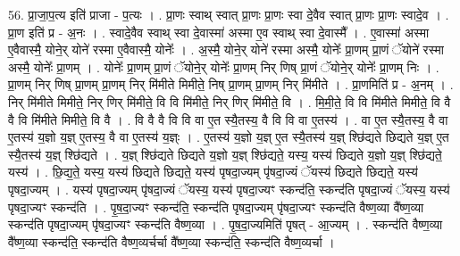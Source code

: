 \documentclass[17pt]{extarticle}
\begin{document}
56. प्रा॒जा॒प॒त्य इति॑ प्राजा - प॒त्यः । . प्रा॒णः स्वाथ् स्वात् प्रा॒णः प्रा॒णः स्वा दे॒वैव स्वात् प्रा॒णः प्रा॒णः स्वादे॒व । . प्रा॒ण इति॑ प्र - अ॒नः । . स्वादे॒वैव स्वाथ् स्वा दे॒वास्मा॑ अस्मा ए॒व स्वाथ् स्वा दे॒वास्मै᳚ । . ए॒वास्मा॑ अस्मा ए॒वैवास्मै॒ योने॒र् योने॑ रस्मा ए॒वैवास्मै॒ योनेः᳚ । . अ॒स्मै॒ योने॒र् योने॑ रस्मा अस्मै॒ योनेः᳚ प्रा॒णम् प्रा॒णं ॅयोने॑ रस्मा अस्मै॒ योनेः᳚ प्रा॒णम् । . योनेः᳚ प्रा॒णम् प्रा॒णं ॅयोने॒र् योनेः᳚ प्रा॒णम् निर् णिष् प्रा॒णं ॅयोने॒र् योनेः᳚ प्रा॒णम् निः । . प्रा॒णम् निर् णिष् प्रा॒णम् प्रा॒णम् निर् मि॑मीते मिमीते॒ निष् प्रा॒णम् प्रा॒णम् निर् मि॑मीते । . प्रा॒णमिति॑ प्र - अ॒नम् । . निर् मि॑मीते मिमीते॒ निर् णिर् मि॑मीते॒ वि वि मि॑मीते॒ निर् णिर् मि॑मीते॒ वि । . मि॒मी॒ते॒ वि वि मि॑मीते मिमीते॒ वि वै वै वि मि॑मीते मिमीते॒ वि वै । . वि वै वै वि वि वा ए॒त स्यै॒तस्य॒ वै वि वि वा ए॒तस्य॑ । . वा ए॒त स्यै॒तस्य॒ वै वा ए॒तस्य॑ य॒ज्ञो य॒ज्ञ् ए॒तस्य॒ वै वा ए॒तस्य॑ य॒ज्ञ्ः । . ए॒तस्य॑ य॒ज्ञो य॒ज्ञ् ए॒त स्यै॒तस्य॑ य॒ज्ञ् श्छि॑द्यते छिद्यते य॒ज्ञ् ए॒त स्यै॒तस्य॑ य॒ज्ञ् श्छि॑द्यते । . य॒ज्ञ् श्छि॑द्यते छिद्यते य॒ज्ञो य॒ज्ञ् श्छि॑द्यते॒ यस्य॒ यस्य॑ छिद्यते य॒ज्ञो य॒ज्ञ् श्छि॑द्यते॒ यस्य॑ । . छि॒द्य॒ते॒ यस्य॒ यस्य॑ छिद्यते छिद्यते॒ यस्य॑ पृषदा॒ज्यम् पृ॑षदा॒ज्यं ॅयस्य॑ छिद्यते छिद्यते॒ यस्य॑ पृषदा॒ज्यम् । . यस्य॑ पृषदा॒ज्यम् पृ॑षदा॒ज्यं ॅयस्य॒ यस्य॑ पृषदा॒ज्यꣳ स्कन्द॑ति॒ स्कन्द॑ति पृषदा॒ज्यं ॅयस्य॒ यस्य॑ पृषदा॒ज्यꣳ स्कन्द॑ति । . पृ॒ष॒दा॒ज्यꣳ स्कन्द॑ति॒ स्कन्द॑ति पृषदा॒ज्यम् पृ॑षदा॒ज्यꣳ स्कन्द॑ति वैष्ण॒व्या वै᳚ष्ण॒व्या स्कन्द॑ति पृषदा॒ज्यम् पृ॑षदा॒ज्यꣳ स्कन्द॑ति वैष्ण॒व्या । . पृ॒ष॒दा॒ज्यमिति॑ पृषत् - आ॒ज्यम् । . स्कन्द॑ति वैष्ण॒व्या वै᳚ष्ण॒व्या स्कन्द॑ति॒ स्कन्द॑ति वैष्ण॒व्यर्चर्चा वै᳚ष्ण॒व्या स्कन्द॑ति॒ स्कन्द॑ति वैष्ण॒व्यर्चा । \newline
\end{document}
